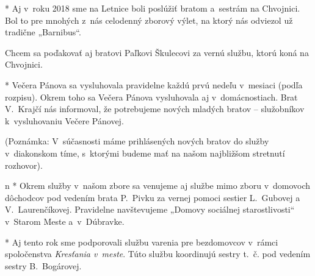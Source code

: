 * 
Aj v~roku 2018 sme na Letnice boli poslúžiť bratom a~sestrám na Chvojnici. Bol to pre mnohých z~nás celodenný zborový výlet, na ktorý nás odviezol už tradične „Barnibus“.

Chcem sa poďakovať aj bratovi Paľkovi Škulecovi za vernú službu, ktorú koná na Chvojnici.

* 
Večera Pánova sa vysluhovala pravidelne každú prvú nedeľu v~mesiaci (podľa rozpisu). Okrem toho sa Večera Pánova vysluhovala aj v~domácnostiach. Brat V.~Krajčí nás informoval, že potrebujeme nových mladých bratov -- služobníkov k~vysluhovaniu Večere Pánovej.

(Poznámka: V~súčasnosti máme prihlásených nových bratov do služby v~diakonskom tíme, s~ktorými budeme mať na našom najbližšom stretnutí rozhovor).
\enditems


\begitems \style n
* 
Okrem služby v~našom zbore sa venujeme aj službe mimo zboru v~domovoch dôchodcov pod vedením brata P.~Pivku za vernej pomoci sestier L.~Gubovej a V.~Laurenčíkovej. Pravidelne navštevujeme „Domovy sociálnej starostlivosti“ v~Starom Meste a~v~Dúbravke.

* 
Aj tento rok sme podporovali službu varenia pre bezdomovcov v~rámci spoločenstva {\it Kresťania v~meste}. Túto službu koordinujú sestry t.~č. pod vedením sestry B.~Bogárovej.
\enditems



